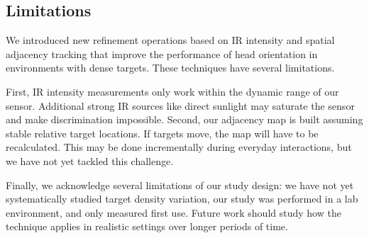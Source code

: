 
\subsection{Limitations}
We introduced new refinement operations based on IR intensity and spatial adjacency tracking that improve the performance of head orientation in environments with dense targets. These techniques have several limitations. 

First, IR intensity measurements only work within the dynamic range of our sensor. Additional strong IR sources like direct sunlight may saturate the sensor and make discrimination impossible. Second, our adjacency map is built assuming stable relative target locations. If targets move, the map will have to be recalculated. This may be done incrementally during everyday interactions, but we have not yet tackled this challenge. 

Finally, we acknowledge several limitations of our study design: we have not yet systematically studied target density variation, our study was performed in a lab environment, and only measured first use. Future work should study how the technique applies in realistic settings over longer periods of time.


